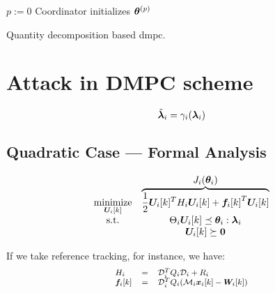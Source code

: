 \documentclass{ifacconf}  %
\begin{document}

\begin{algorithm2e}[h]
  \DontPrintSemicolon%
  $p:=0$\;
  Coordinator initializes $\boldsymbol{\theta}^{(p)}$ \;
 \caption{Quantity decomposition based \acrlong{dmpc}.}\label{alg:quantityAlg}
\end{algorithm2e}

\section{Attack in DMPC scheme}\label{sec:attack}

\begin{equation}\label{eq:cheating}
\tilde{\boldsymbol{\lambda}}_i=\gamma_{i}(\boldsymbol{\lambda}_i)
\end{equation}

\subsection{Quadratic Case --- Formal Analysis}\label{ssec:FA}

\begin{equation}
\begin{matrix}
\underset{\Uik}{\mathrm{minimize}}& \overbrace{\frac{1}{2} \Uik^T H_i\Uik+{\fik}^T\Uik}^{\textstyle J_{i}(\vec{\theta}_{i})}\\
\mathrm{s.t.}&\Theta_{i}\Uik\preceq\vec{\theta}_{i}:\vec{\lambda}_{i}\\
&\Uik\succeq\0
\end{matrix}
\label{eq:quadratic_case}
\end{equation}

If we take reference tracking, for instance, we have:
\begin{equation}
\small\begin{matrix*}[l]
 H_i&=&\mathcal{D}_i^T\bar{Q}_i\mathcal{D}_i+\bar{R}_i\\
\fik&=&\mathcal{D}_i^T\bar{Q}_i(\mathcal{M}_i\xik-\Wik)\\

\end{matrix*}
\label{eq:matrices}
\end{equation}
\end{document}
